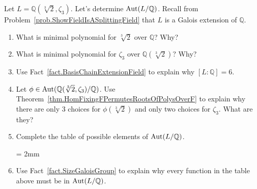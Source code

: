 \begin{problem}\label{prob.AutQAdjoinCubeRoot2AndZeta3OverQ}
Let $L = \mathbb{Q}(\sqrt[3]{2},\zeta_3)$. Let's determine $\operatorname{Aut}(L/\mathbb{Q})$. Recall from Problem~\ref{prob.ShowFieldIsASplittingField} that $L$ is a Galois extension of $\mathbb{Q}$.  
\begin{enumerate}
\item What is minimal polynomial for $\sqrt[3]{2}$ over $\mathbb{Q}$? Why?
\item What is minimal polynomial for $\zeta_3$ over $\mathbb{Q}(\sqrt[3]{2})$? Why?
\item Use Fact~\ref{fact.BasisChainExtensionField} to explain why $[L : \mathbb{Q}] = 6$.
\item Let $\phi\in  \operatorname{Aut}(\mathbb{Q}(\sqrt[3]{2},\zeta_3)/\mathbb{Q})$. Use Theorem~\ref{thm.HomFixingFPermutesRootsOfPolysOverF} to explain why there are only 3 choices for $\phi(\sqrt[3]{2})$ and only two choices for $\zeta_3$. What are they?
\item Complete the table of possible elements of $\operatorname{Aut}(L/\mathbb{Q})$.
\begin{center}
\tabulinesep = 2mm
\end{center}
\item Use Fact~\ref{fact.SizeGaloisGroup} to explain why every function in the table above must be in $\operatorname{Aut}(L/\mathbb{Q})$.
\end{enumerate}
\end{problem}

